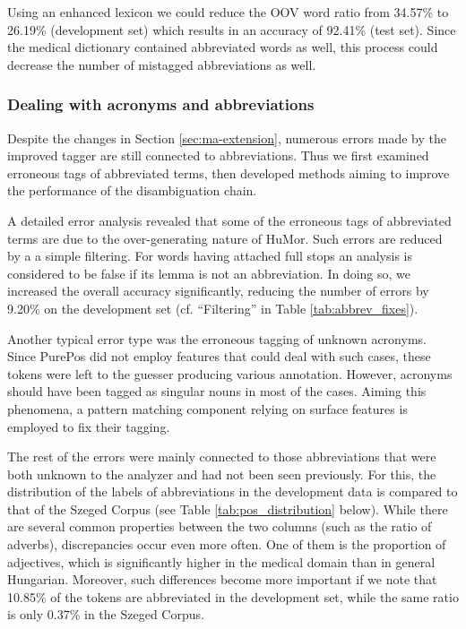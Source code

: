 Using an enhanced lexicon we could reduce the OOV word ratio from 34.57\% to 26.19\% (development set) which results in an accuracy of 92.41\% (test set). Since the medical dictionary \cite{Fabian1992} contained abbreviated words as well, this process could decrease the number of mistagged abbreviations as well.

\subsubsection{Dealing with acronyms and abbreviations}


Despite the changes in Section \ref{sec:ma-extension}, numerous errors made by the improved tagger are still connected to abbreviations. Thus we first examined erroneous tags of abbreviated terms, then developed methods aiming to improve the performance of the disambiguation chain. 

A detailed error analysis revealed that some of the erroneous tags of abbreviated terms are due to the over-generating nature of HuMor. Such errors are reduced by a a simple filtering. 
For words having attached full stops an analysis is considered to be false if its lemma is not an abbreviation. In doing so, we increased the overall accuracy significantly, reducing the number of errors by 9.20\% on the development set (cf. ``Filtering'' in Table \ref{tab:abbrev_fixes}).

Another typical error type was the erroneous tagging of unknown acronyms. Since PurePos did not employ features that could deal with such cases, these tokens were left to the guesser producing various annotation. However, acronyms should have been tagged as singular nouns in most of the cases. Aiming this phenomena, a pattern matching component relying on surface features is employed to fix their tagging.%

The rest of the errors were mainly connected to those abbreviations that were both unknown to the analyzer and had not been seen previously. For this, the distribution of the labels of abbreviations in the development data is compared to that of the Szeged Corpus (see Table \ref{tab:pos_distribution} below).
While there are several common properties between the two columns (such as the ratio of adverbs), discrepancies occur even more often. One of them is the proportion of adjectives, which is significantly higher in the medical domain than in general Hungarian. Moreover, such differences become more important if we note that 10.85\% of the tokens are abbreviated in the development set, while the same ratio is only 0.37\% in the Szeged Corpus. 

